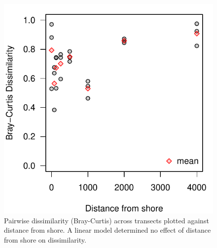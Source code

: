 \documentclass[11pt,letterpaper]{article} %
\begin{document}
{\begin{figure}[h!] %
  \centering
    \includegraphics[width=1\textwidth]{../../Figures/dissimilarity_from_shore.pdf}
    \caption{Pairwise dissimilarity (Bray-Curtis) across transects plotted against distance from shore. A linear model determined no effect of distance from shore on dissimilarity.}
  \label{dissimilarity_from_shore} %
\end{figure}

}
\end{document}
